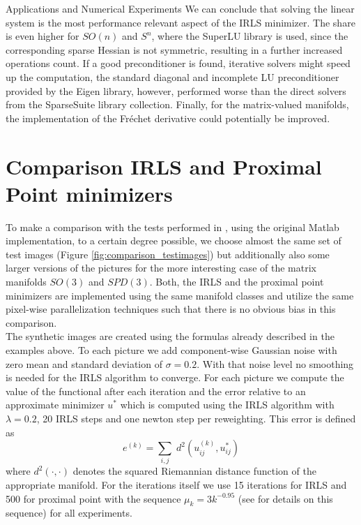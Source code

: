 \begin{chapter}{Applications and Numerical Experiments}
We can conclude that solving the linear system is the most performance relevant aspect of the IRLS minimizer. The share is even higher for $SO(n)$ and $S^n$, where the SuperLU library is used, 
since the corresponding sparse Hessian is not symmetric, resulting in a further increased operations count. If a good preconditioner is found, iterative solvers might speed up the computation, 
the standard diagonal and incomplete LU preconditioner provided by the Eigen library, however, performed worse than the direct solvers from the SparseSuite library collection. Finally, for
the matrix-valued manifolds, the implementation of the Fr\'{e}chet derivative could potentially be improved.




\FloatBarrier
\section{Comparison IRLS and Proximal Point minimizers} %
\label{sec:Comparison IRLS and Proximal Point minimizers}

To make a comparison with the tests performed in \cite{SprecherIRLS}, using the original Matlab implementation, to a certain degree possible, we choose 
almost the same set of test images (Figure \ref{fig:comparison_testimages}) but additionally also some larger versions of the pictures for the more interesting 
case of the matrix manifolds $SO(3)$ and $SPD(3)$. Both, the IRLS and the proximal point minimizers are implemented using the same manifold classes and utilize the
same pixel-wise parallelization techniques such that there is no obvious bias in this comparison.\\

The synthetic images are created using the formulas already described in the examples above. To each picture we add component-wise Gaussian noise with zero mean and
standard deviation of $\sigma=0.2$. With that noise level no smoothing is needed for the IRLS algorithm to converge. 
For each picture we compute the value of the functional after each iteration and the error relative to an approximate minimizer $u^*$
which is computed using the IRLS algorithm with $\lambda=0.2$, 20 IRLS steps and one newton step per reweighting. This error is defined as
\begin{equation}
e^{(k)}=\sum_{i,j}\;d^2(u^{(k)}_{ij},u^*_{ij})
\end{equation}
where $d^2(\cdot,\cdot)$ denotes the squared Riemannian distance function of the appropriate manifold. For the iterations itself we use 15 iterations for IRLS and 500 for proximal point with
the sequence $\mu_k=3k^{-0.95}$ (see \cite{Weinmann} for details on this sequence) for all experiments. \\


\end{chapter}
